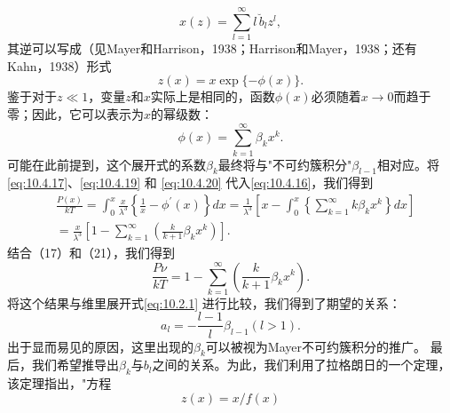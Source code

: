 \begin{equation}\tag{10.4.17}\label{eq:10.4.17}
x ( z ) = \sum _ { l = 1 } ^{\infty} l \, \breve { b } _ { l } z ^{l} ,
\end{equation}
其逆可以写成（见Mayer和Harrison，1938；Harrison和Mayer，1938；还有Kahn，1938）形式
\begin{equation}\tag{10.4.18}\label{eq:10.4.18}
z ( x ) = x \exp \{ - \phi ( x ) \} .
\end{equation}
鉴于对于\(z \ll 1\)，变量\(z\)和\(x\)实际上是相同的，函数\(\phi(x)\)必须随着\(x \to 0\)而趋于零；因此，它可以表示为\(x\)的幂级数：
\begin{equation}\tag{10.4.19}\label{eq:10.4.19}
\phi ( x ) = \sum _ { k = 1 } ^{\infty} \beta _ { k } x ^{k} .
\end{equation}
可能在此前提到，这个展开式的系数\(\beta_{k}\)最终将与"不可约簇积分"\(\beta_{l-1}\)相对应。将\autoref{eq:10.4.17}、\autoref{eq:10.4.19} 和 \autoref{eq:10.4.20} 代入\autoref{eq:10.4.16}，我们得到
\begin{equation}\tag{10.4.20}\label{eq:10.4.20}
\begin{array}{rl} & { \frac { P ( x ) } { k T } = \int _ { 0 } ^{x} \frac { x } { \lambda ^{3} } \left\{ \frac { 1 } { x } - \phi ^{\prime} ( x ) \right\} d x = \frac { 1 } { \lambda ^{3} } \left[ x - \int _ { 0 } ^{x} \left\{ \sum _ { k = 1 } ^{\infty} k \beta _ { k } x ^{k} \right\} d x \right] } \\& { = \frac { x } { \lambda ^{3} } \left[ 1 - \sum _ { k = 1 } ^{\infty} \left( \frac { k } { k + 1 } \beta _ { k } x ^{k} \right) \right] . } \end{array}
\end{equation}
结合（17）和（21），我们得到
\begin{equation}\tag{10.4.21}\label{eq:10.4.21}
\frac { P \nu } { k T } = 1 - \sum _ { k = 1 } ^{\infty} \left( \frac { k } { k + 1 } \beta _ { k } x ^{k} \right) .
\end{equation}
将这个结果与维里展开式\autoref{eq:10.2.1} 进行比较，我们得到了期望的关系：
\begin{equation}\tag{10.4.22}\label{eq:10.4.22}
a _ { l } = - \frac { l - 1 } { l } \beta _ { l - 1 }  ( l > 1 ) .
\end{equation}
出于显而易见的原因，这里出现的\(\beta_{k}\)可以被视为Mayer不可约簇积分的推广。
最后，我们希望推导出\(\beta_{k}\)与\(b_{l}\)之间的关系。为此，我们利用了拉格朗日的一个定理，该定理指出，"方程
\begin{equation}\tag{10.4.23}\label{eq:10.4.23}
z ( x ) = x / f ( x )
\end{equation}
